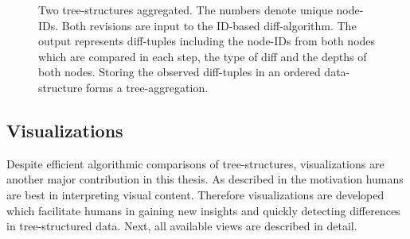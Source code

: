 \begin{figure}[tb]
\caption{\label{fig:aggregation} Two tree-structures aggregated. The numbers denote unique node-IDs. Both revisions are input to the ID-based diff-algorithm. The output represents diff-tuples including the node-IDs from both nodes which are compared in each step, the type of diff and the depths of both nodes. Storing the observed diff-tuples in an ordered data-structure forms a tree-aggregation.}
\end{figure} 

\subsection{Visualizations}
Despite efficient algorithmic comparisons of tree-structures, visualizations are another major contribution in this thesis. As described in the motivation humans are best in interpreting visual content. Therefore visualizations are developed which facilitate humans in gaining new insights and quickly detecting differences in tree-structured data. Next, all available views are described in detail. %


